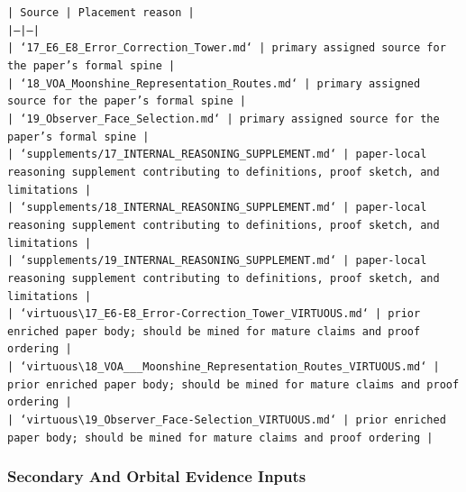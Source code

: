 \documentclass[11pt]{article}
\begin{document}
\noindent\texttt{| Source | Placement reason |}\\
\noindent\texttt{|---|---|}\\
\noindent\texttt{| `17\_E6\_E8\_Error\_Correction\_Tower.md` | primary assigned source for the paper's formal spine |}\\
\noindent\texttt{| `18\_VOA\_Moonshine\_Representation\_Routes.md` | primary assigned source for the paper's formal spine |}\\
\noindent\texttt{| `19\_Observer\_Face\_Selection.md` | primary assigned source for the paper's formal spine |}\\
\noindent\texttt{| `supplements/17\_INTERNAL\_REASONING\_SUPPLEMENT.md` | paper-local reasoning supplement contributing to definitions, proof sketch, and limitations |}\\
\noindent\texttt{| `supplements/18\_INTERNAL\_REASONING\_SUPPLEMENT.md` | paper-local reasoning supplement contributing to definitions, proof sketch, and limitations |}\\
\noindent\texttt{| `supplements/19\_INTERNAL\_REASONING\_SUPPLEMENT.md` | paper-local reasoning supplement contributing to definitions, proof sketch, and limitations |}\\
\noindent\texttt{| `virtuous\textbackslash{}17\_E6-E8\_Error-Correction\_Tower\_VIRTUOUS.md` | prior enriched paper body; should be mined for mature claims and proof ordering |}\\
\noindent\texttt{| `virtuous\textbackslash{}18\_VOA\_\_\_Moonshine\_Representation\_Routes\_VIRTUOUS.md` | prior enriched paper body; should be mined for mature claims and proof ordering |}\\
\noindent\texttt{| `virtuous\textbackslash{}19\_Observer\_Face-Selection\_VIRTUOUS.md` | prior enriched paper body; should be mined for mature claims and proof ordering |}\\

\subsubsection*{Secondary And Orbital Evidence Inputs}
\end{document}
